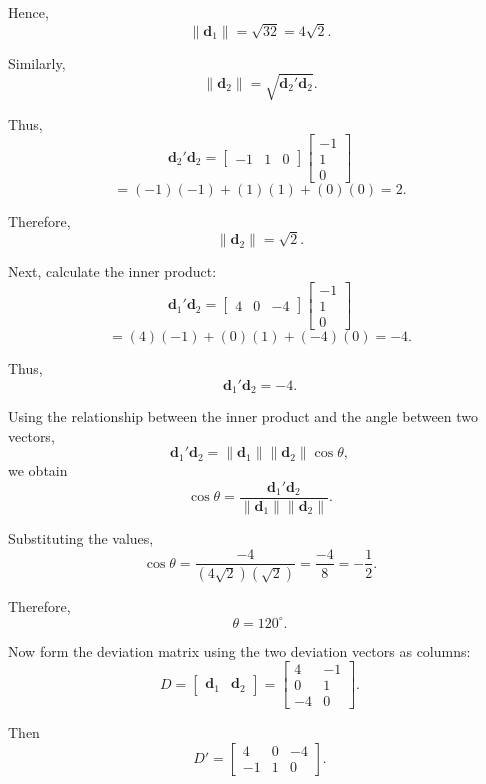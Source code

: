 \documentclass[12pt]{article}
\begin{document}
	Hence,
	\[
	\boxed{\|\mathbf{d}_1\|=\sqrt{32}=4\sqrt{2}}.
	\]
	
	Similarly,
	\[
	\|\mathbf{d}_2\|
	=
	\sqrt{\mathbf{d}_2'\mathbf{d}_2}.
	\]
	
	Thus,
	\[
	\mathbf{d}_2'\mathbf{d}_2
	=
	\begin{bmatrix}
		-1&1&0
	\end{bmatrix}
	\begin{bmatrix}
		-1\\
		1\\
		0
	\end{bmatrix}
	\]
	\[
	=
	(-1)(-1)+(1)(1)+(0)(0)
	=
	2.
	\]
	
	Therefore,
	\[
	\boxed{\|\mathbf{d}_2\|=\sqrt{2}}.
	\]
	
	Next, calculate the inner product:
	\[
	\mathbf{d}_1'\mathbf{d}_2
	=
	\begin{bmatrix}
		4&0&-4
	\end{bmatrix}
	\begin{bmatrix}
		-1\\
		1\\
		0
	\end{bmatrix}
	\]
	\[
	=
	(4)(-1)+(0)(1)+(-4)(0)
	=
	-4.
	\]
	
	Thus,
	\[
	\boxed{\mathbf{d}_1'\mathbf{d}_2=-4}.
	\]
	
	Using the relationship between the inner product and the
	angle between two vectors,
	\[
	\mathbf{d}_1'\mathbf{d}_2
	=
	\|\mathbf{d}_1\|
	\|\mathbf{d}_2\|
	\cos\theta,
	\]
	we obtain
	\[
	\cos\theta
	=
	\frac{\mathbf{d}_1'\mathbf{d}_2}
	{\|\mathbf{d}_1\|\|\mathbf{d}_2\|}.
	\]
	
	Substituting the values,
	\[
	\cos\theta
	=
	\frac{-4}
	{(4\sqrt{2})(\sqrt{2})}
	=
	\frac{-4}{8}
	=
	\boxed{-\frac12}.
	\]
	
	Therefore,
	\[
	\boxed{\theta=120^\circ}.
	\]
	
	Now form the deviation matrix using the two deviation
	vectors as columns:
	\[
	D=
	\begin{bmatrix}
		\mathbf{d}_1&\mathbf{d}_2
	\end{bmatrix}
	=
	\begin{bmatrix}
		4&-1\\
		0&1\\
		-4&0
	\end{bmatrix}.
	\]
	
	Then
	\[
	D'
	=
	\begin{bmatrix}
		4&0&-4\\
		-1&1&0
	\end{bmatrix}.
	\]
	
\end{document}
